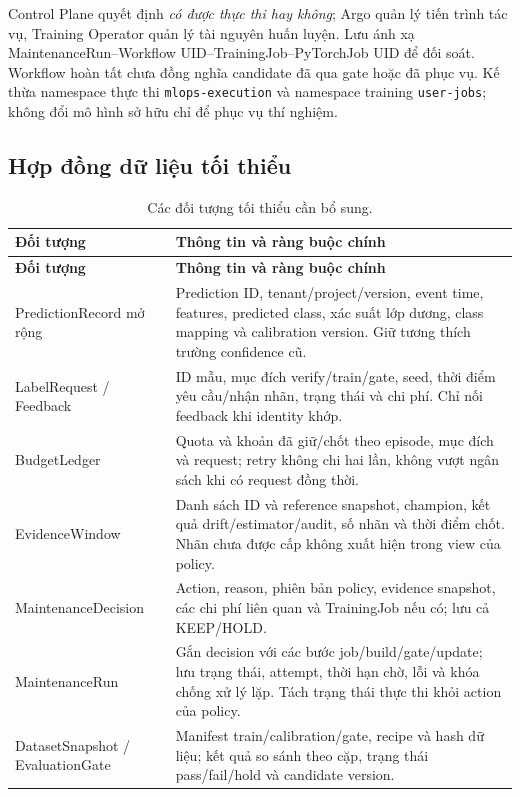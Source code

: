 Control Plane quyết định \emph{có được thực thi hay không}; Argo quản lý tiến trình tác vụ, Training Operator quản lý tài nguyên huấn luyện. Lưu ánh xạ MaintenanceRun--Workflow UID--TrainingJob--PyTorchJob UID để đối soát. Workflow hoàn tất chưa đồng nghĩa candidate đã qua gate hoặc đã phục vụ. Kế thừa namespace thực thi \texttt{mlops-execution} và namespace training \texttt{user-jobs}; không đổi mô hình sở hữu chỉ để phục vụ thí nghiệm.

\subsection{Hợp đồng dữ liệu tối thiểu}

\begin{xltabular}{\linewidth}{@{}L{3.6cm} Y@{}}
\caption{Các đối tượng tối thiểu cần bổ sung.}\label{tab:contracts}\\
\toprule\textbf{Đối tượng} & \textbf{Thông tin và ràng buộc chính} \\
\midrule\endfirsthead
\toprule\textbf{Đối tượng} & \textbf{Thông tin và ràng buộc chính} \\
\midrule\endhead
PredictionRecord mở rộng & Prediction ID, tenant/project/version, event time, features, predicted class, xác suất lớp dương, class mapping và calibration version. Giữ tương thích trường confidence cũ. \\
LabelRequest / Feedback & ID mẫu, mục đích verify/train/gate, seed, thời điểm yêu cầu/nhận nhãn, trạng thái và chi phí. Chỉ nối feedback khi identity khớp. \\
BudgetLedger & Quota và khoản đã giữ/chốt theo episode, mục đích và request; retry không chi hai lần, không vượt ngân sách khi có request đồng thời. \\
EvidenceWindow & Danh sách ID và reference snapshot, champion, kết quả drift/estimator/audit, số nhãn và thời điểm chốt. Nhãn chưa được cấp không xuất hiện trong view của policy. \\
MaintenanceDecision & Action, reason, phiên bản policy, evidence snapshot, các chi phí liên quan và TrainingJob nếu có; lưu cả KEEP/HOLD. \\
MaintenanceRun & Gắn decision với các bước job/build/gate/update; lưu trạng thái, attempt, thời hạn chờ, lỗi và khóa chống xử lý lặp. Tách trạng thái thực thi khỏi action của policy. \\
DatasetSnapshot / EvaluationGate & Manifest train/calibration/gate, recipe và hash dữ liệu; kết quả so sánh theo cặp, trạng thái pass/fail/hold và candidate version. \\
\bottomrule
\end{xltabular}

